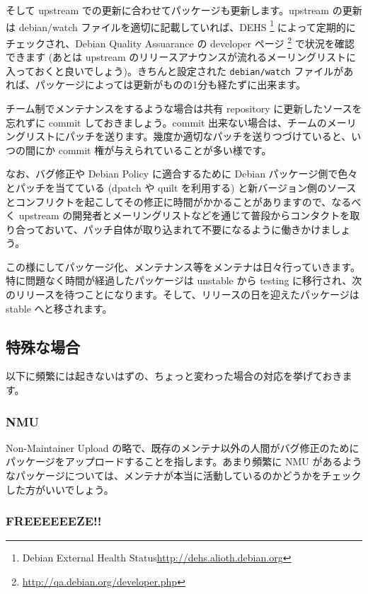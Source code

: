 \documentclass[mingoth,a4paper]{jsarticle}
\begin{document}
そして upstream での更新に合わせてパッケージも更新します。upstream の更新は debian/watch ファイルを適切に記載していれば、DEHS \footnote{Debian External Health Status\url{http://dehs.alioth.debian.org}} によって定期的にチェックされ、Debian Quality Assuarance の developer ページ \footnote{\url{http://qa.debian.org/developer.php}} で状況を確認できます (あとは upstream のリリースアナウンスが流れるメーリングリストに入っておくと良いでしょう)。きちんと設定された \texttt{debian/watch} ファイルがあれば、パッケージによっては更新がものの1分も経たずに出来ます。

チーム制でメンテナンスをするような場合は共有 repository に更新したソースを忘れずに commit しておきましょう。commit 出来ない場合は、チームのメーリングリストにパッチを送ります。幾度か適切なパッチを送りつづけていると、いつの間にか commit 権が与えられていることが多い様です。

なお、バグ修正や Debian Policy に適合するために Debian パッケージ側で色々とパッチを当てている (dpatch や quilt を利用する) と新バージョン側のソースとコンフリクトを起こしてその修正に時間がかかることがありますので、なるべく upstream の開発者とメーリングリストなどを通じて普段からコンタクトを取り合っておいて、パッチ自体が取り込まれて不要になるように働きかけましょう。

この様にしてパッケージ化、メンテナンス等をメンテナは日々行っていきます。特に問題なく時間が経過したパッケージは unstable から testing に移行され、次のリリースを待つことになります。そして、リリースの日を迎えたパッケージは stable へと移されます。


\subsection{特殊な場合}

以下に頻繁には起きないはずの、ちょっと変わった場合の対応を挙げておきます。

\subsubsection{NMU}

Non-Maintainer Upload の略で、既存のメンテナ以外の人間がバグ修正のためにパッケージをアップロードすることを指します。あまり頻繁に NMU があるようなパッケージについては、メンテナが本当に活動しているのかどうかをチェックした方がいいでしょう。

\subsubsection{FREEEEEEZE!!}
\end{document}
